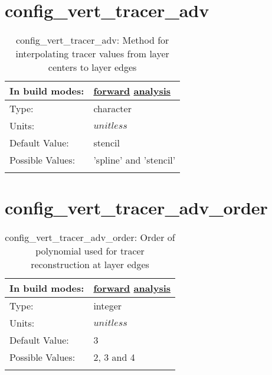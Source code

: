 \section[config\_vert\_tracer\_adv]{config\_vert\_tracer\_adv}
\label{sec:nm_sec_config_vert_tracer_adv}
\begin{center}
\begin{longtable}{| p{2.0in} || p{4.0in} |}
    \hline
    In build modes: & \hyperref[subsec:forward_nm_tab_advection]{forward} \hyperref[subsec:analysis_nm_tab_advection]{analysis} \\
    \hline
    Type: & character \\
    \hline
    Units: & $unitless$ \\
    \hline
    Default Value: & stencil \\
    \hline
    Possible Values: & 'spline' and 'stencil' \\
    \hline
    \caption{config\_vert\_tracer\_adv: Method for interpolating tracer values from layer centers to layer edges}
\end{longtable}
\end{center}
\section[config\_vert\_tracer\_adv\_order]{config\_vert\_tracer\_adv\_order}
\label{sec:nm_sec_config_vert_tracer_adv_order}
\begin{center}
\begin{longtable}{| p{2.0in} || p{4.0in} |}
    \hline
    In build modes: & \hyperref[subsec:forward_nm_tab_advection]{forward} \hyperref[subsec:analysis_nm_tab_advection]{analysis} \\
    \hline
    Type: & integer \\
    \hline
    Units: & $unitless$ \\
    \hline
    Default Value: & 3 \\
    \hline
    Possible Values: & 2, 3 and 4 \\
    \hline
    \caption{config\_vert\_tracer\_adv\_order: Order of polynomial used for tracer reconstruction at layer edges}
\end{longtable}
\end{center}
